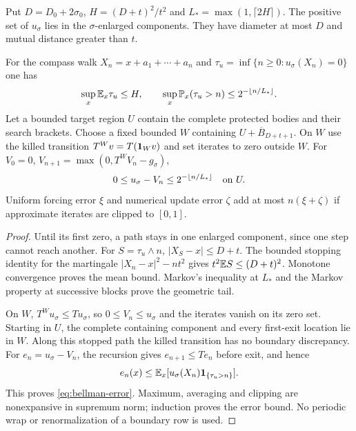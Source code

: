 Put $D=D_0+2\sigma_0$, $H=(D+t)^2/t^2$ and
$L_* =\max(1,\lceil2H\rceil)$. The positive set of $u_\sigma$ lies in
the $\sigma$-enlarged components. They have diameter at most $D$ and
mutual distance greater than $t$.

\begin{lemma}\label{lem:stopped}
For the compass walk $X_n=x+a_1+\cdots+a_n$ and
$\tau_u=\inf\{n\ge0:u_\sigma(X_n)=0\}$ one has
\begin{equation}\label{eq:survival}
 \sup_x\mathbb E_x\tau_u\le H,\qquad
 \sup_x\mathbb P_x(\tau_u>n)\le2^{-\lfloor n/L_*\rfloor}.
\end{equation}
Let a bounded target region $U$ contain the complete protected bodies
and their search brackets. Choose a fixed bounded $W$ containing
$U+\overline B_{D+t+1}$. On $W$ use the killed transition
$T^Wv=T(\mathbf 1_Wv)$ and set iterates to zero outside $W$. For
$V_0=0$, $V_{n+1}=\max(0,T^WV_n-g_\sigma)$,
\begin{equation}\label{eq:bellman-error}
 0\le u_\sigma-V_n\le2^{-\lfloor n/L_*\rfloor}\quad\hbox{on }U.
\end{equation}
Uniform forcing error $\xi$ and numerical update error $\zeta$ add
at most $n(\xi+\zeta)$ if approximate iterates are clipped to $[0,1]$.
\end{lemma}
\begin{proof}
Until its first zero, a path stays in one enlarged component, since
one step cannot reach another. For $S=\tau_u\wedge n$,
$|X_S-x|\le D+t$. The bounded stopping identity for the martingale
$|X_n-x|^2-nt^2$ gives $t^2\mathbb E S\le(D+t)^2$. Monotone convergence
proves the mean bound. Markov's inequality at $L_*$ and the Markov
property at successive blocks prove the geometric tail.

On $W$, $T^Wu_\sigma\le Tu_\sigma$, so $0\le V_n\le u_\sigma$
and the iterates vanish on its zero set. Starting in $U$, the complete
containing component and every first-exit location lie in $W$. Along
this stopped path the killed transition has no boundary discrepancy.
For $e_n=u_\sigma-V_n$, the recursion gives $e_{n+1}\le Te_n$ before
exit, and hence
\[
 e_n(x)\le\mathbb E_x[u_\sigma(X_n)\mathbf 1_{\{\tau_u>n\}}].
\]
This proves \eqref{eq:bellman-error}. Maximum, averaging and clipping
are nonexpansive in supremum norm; induction proves the error bound.
No periodic wrap or renormalization of a boundary row is used.
\end{proof}

